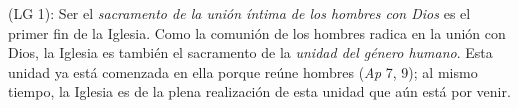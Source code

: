   (LG 1): Ser el \emph{sacramento de la unión íntima de los hombres con Dios} es el primer fin de la Iglesia. Como la comunión de los hombres radica en la unión con Dios, la Iglesia es también el sacramento de la \emph{unidad del género humano}. Esta unidad ya está comenzada en ella porque reúne hombres  (\emph{Ap} 7, 9); al mismo tiempo, la Iglesia es  de la plena realización de esta unidad que aún está por venir.